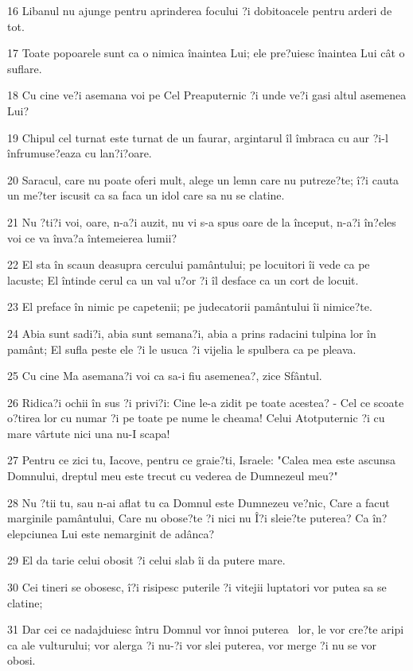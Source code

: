 \par 16 Libanul nu ajunge pentru aprinderea focului ?i dobitoacele pentru arderi de tot.
\par 17 Toate popoarele sunt ca o nimica înaintea Lui; ele pre?uiesc înaintea Lui cât o suflare.
\par 18 Cu cine ve?i asemana voi pe Cel Preaputernic ?i unde ve?i gasi altul asemenea Lui?
\par 19 Chipul cel turnat este turnat de un faurar, argintarul îl îmbraca cu aur ?i-l înfrumuse?eaza cu lan?i?oare.
\par 20 Saracul, care nu poate oferi mult, alege un lemn care nu putreze?te; î?i cauta un me?ter iscusit ca sa faca un idol care sa nu se clatine.
\par 21 Nu ?ti?i voi, oare, n-a?i auzit, nu vi s-a spus oare de la început, n-a?i în?eles voi ce va înva?a întemeierea lumii?
\par 22 El sta în scaun deasupra cercului pamântului; pe locuitori îi vede ca pe lacuste; El întinde cerul ca un val u?or ?i îl desface ca un cort de locuit.
\par 23 El preface în nimic pe capetenii; pe judecatorii pamântului îi nimice?te.
\par 24 Abia sunt sadi?i, abia sunt semana?i, abia a prins radacini tulpina lor în pamânt; El sufla peste ele ?i le usuca ?i vijelia le spulbera ca pe pleava.
\par 25 Cu cine Ma asemana?i voi ca sa-i fiu asemenea?, zice Sfântul.
\par 26 Ridica?i ochii în sus ?i privi?i: Cine le-a zidit pe toate acestea? - Cel ce scoate o?tirea lor cu numar ?i pe toate pe nume le cheama! Celui Atotputernic ?i cu mare vârtute nici una nu-I scapa!
\par 27 Pentru ce zici tu, Iacove, pentru ce graie?ti, Israele: "Calea mea este ascunsa Domnului, dreptul meu este trecut cu vederea de Dumnezeul meu?"
\par 28 Nu ?tii tu, sau n-ai aflat tu ca Domnul este Dumnezeu ve?nic, Care a facut marginile pamântului, Care nu obose?te ?i nici nu Î?i sleie?te puterea? Ca în?elepciunea Lui este nemarginit de adânca?
\par 29 El da tarie celui obosit ?i celui slab îi da putere mare.
\par 30 Cei tineri se obosesc, î?i risipesc puterile ?i vitejii luptatori vor putea sa se clatine;
\par 31 Dar cei ce nadajduiesc întru Domnul vor înnoi puterea  lor, le vor cre?te aripi ca ale vulturului; vor alerga ?i nu-?i vor slei puterea, vor merge ?i nu se vor obosi.

